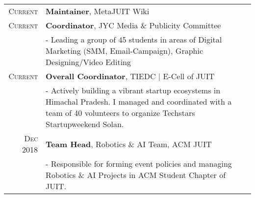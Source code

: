 \documentclass[a4paper,10pt]{extarticle}
\begin{document}
\begin{tabular}{r|p{17.5cm}}
\textsc{Current} & \textbf{Maintainer}, MetaJUIT Wiki\\
\textsc{Current} & \textbf{Coordinator}, JYC Media \& Publicity Committee \\
& {- Leading a group of 45 students in areas of Digital Marketing (SMM, Email-Campaign), Graphic Designing/Video Editing}\\
\textsc{Current} & \textbf{Overall Coordinator}, TIEDC | E-Cell of JUIT\\
& {- Actively building a vibrant startup ecosystems in Himachal Pradesh. I managed and coordinated with a team of 40 volunteers to organize Techstars Startupweekend Solan.}\\
\textsc{Dec 2018} & \textbf{Team Head}, Robotics \& AI Team, ACM JUIT \\
& {- Responsible for forming event policies and managing Robotics \& AI Projects in ACM Student Chapter of JUIT.}\\
\end{tabular}






\end{document}
